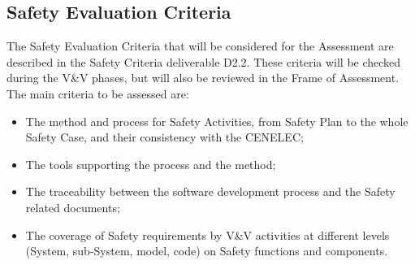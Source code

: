 \documentclass[openetcs]{template/openetcs_article}
\begin{document}
\subsection{Safety Evaluation Criteria}
The Safety Evaluation Criteria that will be considered for the Assessment are described in the Safety Criteria deliverable D2.2. These criteria will be
checked during the V\&V phases, but will also be reviewed in the Frame of Assessment.
The main criteria to be assessed are:
\begin{itemize}
\item The method and process for Safety Activities, from Safety Plan to the whole Safety Case, and their consistency with the CENELEC;
\item The tools supporting the process and the method;
\item The traceability between the software development process and the Safety related documents;
\item The coverage of Safety requirements by V\&V activities at different levels (System,  sub-System, model, code) on Safety functions and components.
\end{itemize}
\end{document}
